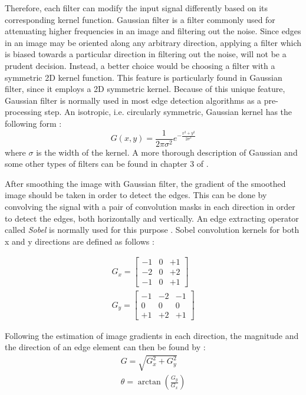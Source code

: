 \documentclass[12pt]{report}
\begin{document}
Therefore, each filter can modify the input signal differently based on its corresponding kernel function.
Gaussian filter is a filter commonly used for attenuating higher frequencies in an image and filtering out the noise. Since edges in an image may be oriented along any arbitrary direction, 
applying a filter which is biased towards a particular direction in filtering out the noise, will not be a prudent decision. Instead, a better choice would be choosing a filter 
with a symmetric 2D kernel function. 
This feature is particularly found in Gaussian filter, since it employs a 2D symmetric kernel. Because of this unique feature, 
Gaussian filter is normally used in most edge detection algorithms as a pre-processing step.
An isotropic, i.e. circularly symmetric, Gaussian kernel has the following form \cite{sze11}:
\begin{equation}
G(x,y)=\frac{1}{2\pi \sigma ^{2}} e^{-\frac{x^{2}+y^{2}}{2\sigma^{2}}}
\end{equation}
where $\sigma$ is the width of the kernel. 
A more thorough description of Gaussian and some other types of filters can be found in chapter 3 of \cite{sze11}.

After smoothing the image with Gaussian filter, the gradient of the smoothed image should be taken in order to detect the edges. This can be done by convolving 
the signal with a pair of convolution masks in each direction in order to detect the edges, both horizontally and vertically. An edge extracting operator called {\it Sobel} is normally used
for this purpose \cite{sze11}. 
Sobel convolution kernels for both x and y directions are defined as follows \cite{sze11}:

\begin{align}
G_{x} = \begin{bmatrix}
-1 & 0 & +1 \\ 
-2 & 0 & +2 \\ 
-1 & 0 & +1
\end{bmatrix} \\
G_{y} = \begin{bmatrix}
-1 & -2 & -1 \\ 
0 & 0 & 0 \\ 
+1 & +2 & +1
\end{bmatrix}
\end{align}

Following the estimation of image gradients in each direction, the magnitude and the direction of an edge element can then be found by \cite{sze11}:
\begin{align}
G=\sqrt{G_{x}^{2} + G_{y}^{2}} \\
\theta = \arctan (\frac{G_{y}}{G_{x}})
\end{align}
\end{document}
